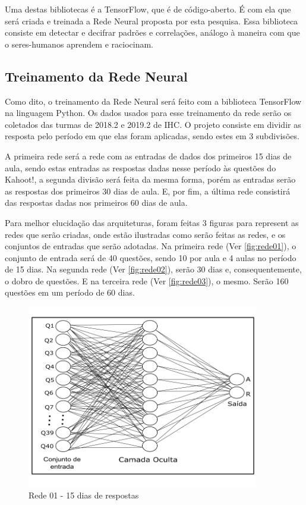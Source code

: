 \documentclass[
	12pt,				%
	openright,			%
	oneside,
	a4paper,			%
	english,			%
	french,				%
	spanish,			%
	brazil,				%
	]{abntex2}
\begin{document}
Uma destas bibliotecas é a TensorFlow, que é de código-aberto. É com ela que será criada e treinada a Rede Neural proposta por esta pesquisa. Essa biblioteca consiste em detectar e decifrar padrões e correlações, análogo à maneira com que o seres-humanos aprendem e raciocinam.

\subsection{Treinamento da Rede Neural}

Como dito, o treinamento da Rede Neural será feito com a biblioteca TensorFlow na linguagem Python. Os dados usados para esse treinamento da rede serão os coletados das turmas de 2018.2 e 2019.2 de IHC. O projeto consiste em dividir as resposta pelo período em que elas foram aplicadas, sendo estes em 3 subdivisões.

A primeira rede será a rede com as entradas de dados dos primeiros 15 dias de aula, sendo estas entradas as respostas dadas nesse período às questões do Kahoot!, a segunda divisão será feita da mesma forma, porém as entradas serão as respostas dos primeiros 30 dias de aula. E, por fim, a última rede consistirá das respostas dadas nos primeiros 60 dias de aula.

Para melhor elucidação das arquiteturas, foram feitas 3 figuras para represent as redes que serão criadas, onde estão ilustradas como serão feitas as redes, e os conjuntos de entradas que serão adotadas. Na primeira rede (Ver \autoref{fig:rede01}), o conjunto de entrada será de 40 questões, sendo 10 por aula e 4 aulas no período de 15 dias. Na segunda rede (Ver \autoref{fig:rede02}), serão 30 dias e, consequentemente, o dobro de questões. E na terceira rede (Ver \autoref{fig:rede03}), o mesmo. Serão 160 questões em um período de 60 dias.

\begin{figure}
    \centering
    \includegraphics[width=0.9\textwidth]{Modelo_Projeto_Pesquisa_UFG_REJ_BCC/rede01_15.png}
    \caption{Rede 01 - 15 dias de respostas}
    \label{fig:rede01}
\end{figure}
\end{document}
